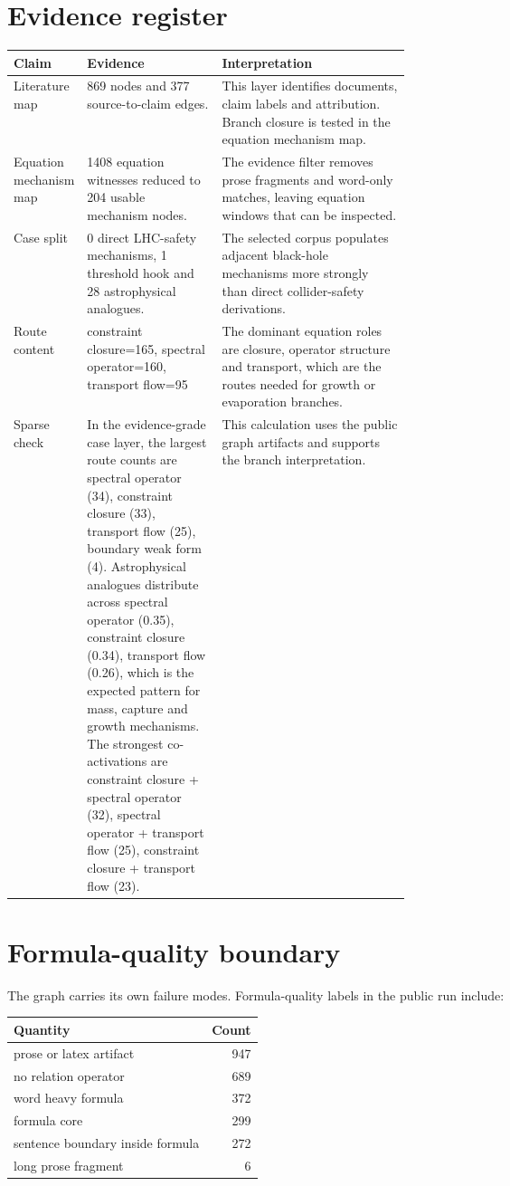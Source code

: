 \documentclass[11pt]{article}
\begin{document}
\section{Evidence register}

\begin{tabularx}{\linewidth}{p{0.17\linewidth}p{0.34\linewidth}X}
\toprule
Claim & Evidence & Interpretation\\
\midrule
Literature map & 869 nodes and 377 source-to-claim edges. & This layer identifies documents, claim labels and attribution. Branch closure is tested in the equation mechanism map.\\
Equation mechanism map & 1408 equation witnesses reduced to 204 usable mechanism nodes. & The evidence filter removes prose fragments and word-only matches, leaving equation windows that can be inspected.\\
Case split & 0 direct LHC-safety mechanisms, 1 threshold hook and 28 astrophysical analogues. & The selected corpus populates adjacent black-hole mechanisms more strongly than direct collider-safety derivations.\\
Route content & constraint closure=165, spectral operator=160, transport flow=95 & The dominant equation roles are closure, operator structure and transport, which are the routes needed for growth or evaporation branches.\\
Sparse check & In the evidence-grade case layer, the largest route counts are spectral operator (34), constraint closure (33), transport flow (25), boundary weak form (4). Astrophysical analogues distribute across spectral operator (0.35), constraint closure (0.34), transport flow (0.26), which is the expected pattern for mass, capture and growth mechanisms. The strongest co-activations are constraint closure + spectral operator (32), spectral operator + transport flow (25), constraint closure + transport flow (23). & This calculation uses the public graph artifacts and supports the branch interpretation.\\
\bottomrule
\end{tabularx}

\section{Formula-quality boundary}

The graph carries its own failure modes. Formula-quality labels in the public run
include:

\begin{center}
\begin{tabular}{lr}
\toprule
Quantity & Count\\
\midrule
prose or latex artifact & 947\\
no relation operator & 689\\
word heavy formula & 372\\
formula core & 299\\
sentence boundary inside formula & 272\\
long prose fragment & 6\\
\bottomrule
\end{tabular}
\end{center}
\end{document}
